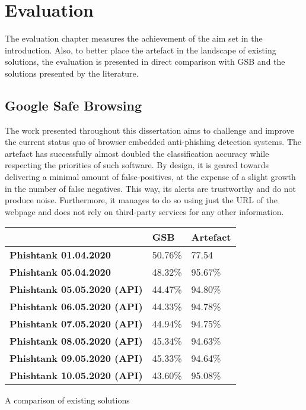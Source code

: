\chapter{Evaluation}
The evaluation chapter measures the achievement of the aim set in the introduction. Also, to better place the artefact in the landscape of existing solutions, the evaluation is presented in direct comparison with GSB and the solutions presented by the literature.

\section{Google Safe Browsing}
The work presented throughout this dissertation aims to challenge and improve the current status quo of browser embedded anti-phishing detection systems. The artefact has successfully almost doubled the classification accuracy while respecting the priorities of such software. By design, it is geared towards delivering a minimal amount of false-positives, at the expense of a slight growth in the number of false negatives. This way, its alerts are trustworthy and do not produce noise. Furthermore, it manages to do so using just the URL of the webpage and does not rely on third-party services for any other information.

\begin{singlespace}
    \small
    \begin{center}
        \label{tab:ARTEFACT_VS_GSB}
        \begin{tabular}{ | m{14em} | m{5em} | m{5em} |}
            \hline
                                                & \textbf{GSB} & \textbf{Artefact} \\
            \hline
            \textbf{Phishtank 01.04.2020}       & 50.76\%      & 77.54             \\
            \hline
            \textbf{Phishtank 05.04.2020}       & 48.32\%      & 95.67\%           \\
            \hline
            \textbf{Phishtank 05.05.2020 (API)} & 44.47\%      & 94.80\%           \\
            \hline
            \textbf{Phishtank 06.05.2020 (API)} & 44.33\%      & 94.78\%           \\
            \hline
            \textbf{Phishtank 07.05.2020 (API)} & 44.94\%      & 94.75\%           \\
            \hline
            \textbf{Phishtank 08.05.2020 (API)} & 45.34\%      & 94.63\%           \\
            \hline
            \textbf{Phishtank 09.05.2020 (API)} & 45.33\%      & 94.64\%           \\
            \hline
            \textbf{Phishtank 10.05.2020 (API)} & 43.60\%      & 95.08\%           \\
            \hline
        \end{tabular}
        \captionsetup{type=table}\caption{A comparison of existing solutions \citep{Adebowale}}
    \end{center}
\end{singlespace}

